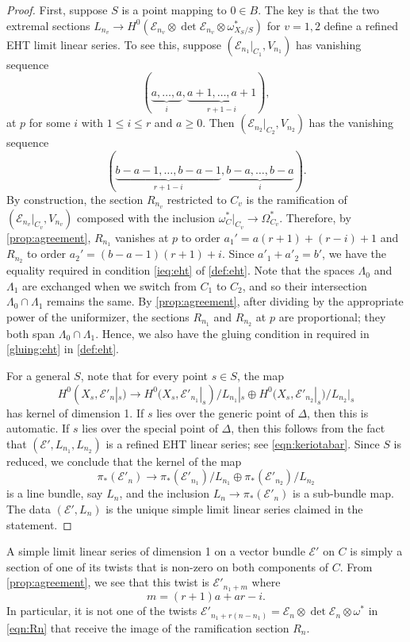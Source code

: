 \documentclass[11pt,reqno]{amsart}
\theoremstyle{plain}
\theoremstyle{definition}
\theoremstyle{remark}
\numberwithin{equation}{section}
\renewcommand{\to}{{\longrightarrow}}
\numberwithin{equation}{section}
\begin{document}
\begin{proof}
  First, suppose $S$ is a point mapping to $0 \in B$.
  The key is that the two extremal sections $L_{n_v} \to H^0(\mathcal E_{n_v} \otimes \det \mathcal E_{n_v} \otimes \omega_{X_S/S}^*)$ for $v = 1, 2$ define a refined EHT limit linear series.
  To see this, suppose $(\mathcal E_{n_1} |_{C_1}, V_{n_1})$ has vanishing sequence
  \[(\underbrace{a, \dots, a}_{i}, \underbrace{a+1, \dots, a+1}_{r+1-i}),\]
  at $p$ for some $i$ with $1 \leq i \leq r$ and $a \geq  0$.
  Then $(\mathcal E_{n_2}|_{C_2}, V_{n_2})$ has the vanishing sequence
  \[ (\underbrace{b-a-1, \dots, b-a-1}_{r+1-i}, \underbrace{b-a, \dots, b-a}_{i}).\]
  By construction, the section $R_{n_v}$ restricted to $C_v$ is the ramification of $(\mathcal E_{n_v}|_{C_v}, V_{n_v})$ composed with the inclusion $\omega^*_{C}|_{C_v} \to \Omega^*_{C_v}$.
  Therefore, by \autoref{prop:agreement}, $R_{n_1}$ vanishes at $p$ to order $a_1' = a(r+1)+(r-i)+1$ and $R_{n_2}$ to order $a_2' = (b-a-1)(r+1)+i$.
  Since $a'_1 + a'_2 = b'$, we have the equality required in condition \eqref{ieq:eht} of \autoref{def:eht}.
  Note that the spaces $\Lambda_0$ and $\Lambda_1$ are exchanged when we switch from $C_1$ to $C_2$, and so their intersection $\Lambda_0 \cap \Lambda_1$ remains the same.
  By \autoref{prop:agreement}, after dividing by the appropriate power of the uniformizer, the sections $R_{n_1}$ and $R_{n_2}$ at $p$ are proportional; they both span $\Lambda_0 \cap \Lambda_1$.
  Hence, we also have the gluing condition in required in \eqref{gluing:eht} in \autoref{def:eht}.

  For a general $S$, note that for every point $s \in S$, the map
  \[ H^0(X_s, \mathcal E'_n|_s) \to H^0(X_s,\mathcal E'_{n_1}|_s)/L_{n_1}|_s \oplus H^0(X_s,\mathcal E'_{n_2}|_s)/L_{n_2}|_s\]
  has kernel of dimension 1.
  If $s$ lies over the generic point of $\Delta$, then this is automatic.
  If $s$ lies over the special point of $\Delta$, then this follows from the fact that $(\mathcal E', L_{n_1}, L_{n_2})$ is a refined EHT linear series; see \eqref{eqn:keriotabar}.
  Since $S$ is reduced, we conclude that the kernel of the map
  \[ \pi_*(\mathcal E'_n) \to \pi_*(\mathcal E'_{n_1})/L_{n_1} \oplus \pi_*(\mathcal E'_{n_2})/L_{n_2} \]
  is a line bundle, say $L_n$, and the inclusion $L_n \to \pi_*(\mathcal E'_n)$ is a sub-bundle map.
  The data $(\mathcal E', L_n)$ is the unique simple limit linear series claimed in the statement.
\end{proof}

\begin{remark}
  A simple limit linear series of dimension 1 on a vector bundle $\mathcal E'$ on $C$ is simply a section of one of its twists that is non-zero on both components of $C$.
  From \autoref{prop:agreement}, we see that this twist is $\mathcal E'_{n_1+m}$ where
  \[ m = (r+1)a+ar-i.\]
  In particular, it is not one of the twists $\mathcal E'_{n_1+r(n-n_1)} = \mathcal E_n \otimes \det \mathcal E_n \otimes \omega^*$ in \eqref{eqn:Rn} that receive the image of the ramification section $R_n$.
\end{remark}
\end{document}
